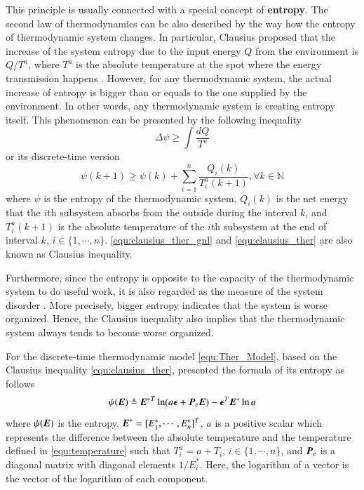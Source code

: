 \documentclass[preprint,authoryear,12pt]{elsarticle}
\renewcommand{\vec}[1]{\mbox{\boldmath$#1$}}
\newcommand{\mat}[1]{\mbox{\boldmath$#1$}}
\begin{document}
This principle is usually connected with a special concept of
\textbf{entropy}. The second law of thermodynamics can be also
described by the way how the entropy of thermodynamic system changes.
In particular, Clausius proposed that the increase of the system
entropy due to the input energy $Q$ from the environment is $Q/T^a$,
where $T^a$ is the absolute temperature at the spot where the energy
transmission happens \citep{clausius_mechanical_1867}. However, for
any thermodynamic system, the actual increase of entropy is bigger
than or equals to the one supplied by the environment. In other
words, any thermodynamic system is creating entropy itself. This
phenomenon can be presented by the following inequality
\begin{equation}\label{equ:clausius_ther_gnl}
\Delta \psi \ge \int\frac{dQ}{T^a}
\end{equation}
or its discrete-time version \citep{haddad_thermodynamic_2005}
\begin{equation}\label{equ:clausius_ther}
\psi(k+1) \ge \psi(k)+\sum_{i=1}^{n}\frac{Q_i(k)}{T^a_i(k+1)},
\forall k\in\mathbb{N}
\end{equation}
where $\psi$ is the entropy of the thermodynamic system, $Q_i(k)$ is
the net energy that the $i$th subsystem absorbs from the outside
during the interval $k$, and $T^a_i(k+1)$ is the absolute temperature
of the $i$th subsystem at the end of interval $k$,
$i\in\{1,\cdots,n\}$. \eqref{equ:clausius_ther_gnl} and
\eqref{equ:clausius_ther} are also known as Clausius inequality.

Furthermore, since the entropy is opposite to the capacity of the
thermodynamic system to do useful work, it is also regarded as the
measure of the system disorder \citep{balmakov_entropy_2001}. More
precisely, bigger entropy indicates that the system is worse
organized. Hence, the Clausius inequality also implies that the
thermodynamic system always tends to become worse organized.

For the discrete-time thermodynamic model \eqref{equ:Ther_Model},
based on the Clausius inequality \eqref{equ:clausius_ther},
\citet{haddad_thermodynamic_2005} presented the formula of its
entropy as follows
\begin{equation}
\psi(\vec{E}) \triangleq{\vec{E}^*}^T \ln
(a\vec{\epsilon}+\mat{P}_e\vec{E}) -\vec{\epsilon}^T\vec{E}^*\ln a
\label{equ:Ther_entropy}
\end{equation}
where $\psi(\vec{E})$ is the entropy,
$\vec{E}^*=[E^*_1,\cdots,E^*_n]^T$, $a$ is a positive scalar which
represents the difference between the absolute temperature and the
temperature defined in \eqref{equ:temperature} such that
$T^a_i=a+T_i$, $i\in\{1,\cdots,n\}$, and $\mat{P}_e$ is a diagonal
matrix with diagonal elements $1/E^*_i$. Here, the logarithm of a
vector is the vector of the logarithm of each component.
\end{document}
